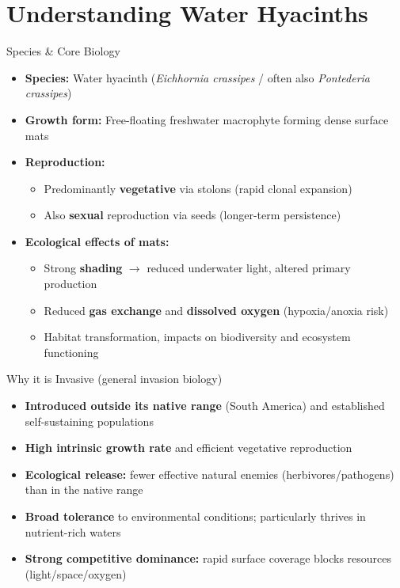 \part[nopartpage]{Understanding Water Hyacinths}

\begin{frame}{Species \& Core Biology}
\begin{itemize}
  \item \textbf{Species:} Water hyacinth (\textit{Eichhornia crassipes} / often also \textit{Pontederia crassipes})
  \item \textbf{Growth form:} Free-floating freshwater macrophyte forming dense surface mats
  \item \textbf{Reproduction:}
    \begin{itemize}
      \item Predominantly \textbf{vegetative} via stolons (rapid clonal expansion)
      \item Also \textbf{sexual} reproduction via seeds (longer-term persistence)
    \end{itemize}
  \item \textbf{Ecological effects of mats:}
    \begin{itemize}
      \item Strong \textbf{shading} $\rightarrow$ reduced underwater light, altered primary production
      \item Reduced \textbf{gas exchange} and \textbf{dissolved oxygen} (hypoxia/anoxia risk)
      \item Habitat transformation, impacts on biodiversity and ecosystem functioning
    \end{itemize}
\end{itemize}
\end{frame}

\begin{frame}{Why it is Invasive (general invasion biology)}
\begin{itemize}
  \item \textbf{Introduced outside its native range} (South America) and established self-sustaining populations
  \item \textbf{High intrinsic growth rate} and efficient vegetative reproduction
  \item \textbf{Ecological release:} fewer effective natural enemies (herbivores/pathogens) than in the native range
  \item \textbf{Broad tolerance} to environmental conditions; particularly thrives in nutrient-rich waters
  \item \textbf{Strong competitive dominance:} rapid surface coverage blocks resources (light/space/oxygen)
\end{itemize}
\end{frame}

